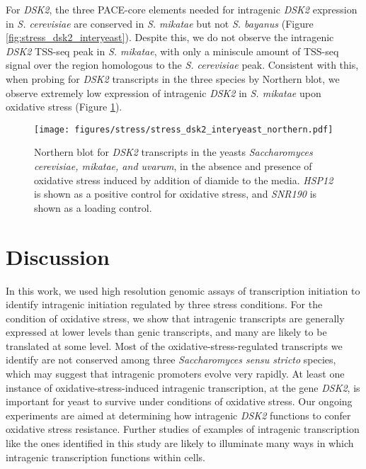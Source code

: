 For \textit{DSK2}, the three PACE-core elements needed for intragenic \textit{DSK2} expression in \textit{S. cerevisiae} are conserved in \textit{S. mikatae} but not \textit{S. bayanus} (Figure \ref{fig:stress_dsk2_interyeast}).
Despite this, we do not observe the intragenic \textit{DSK2} TSS-seq peak in \textit{S. mikatae}, with only a miniscule amount of TSS-seq signal over the region homologous to the \textit{S. cerevisiae} peak.
Consistent with this, when probing for \textit{DSK2} transcripts in the three species by Northern blot, we observe extremely low expression of intragenic \textit{DSK2} in \textit{S. mikatae} upon oxidative stress (Figure \ref{fig:stress_dsk2_interyeast_northern}).

\begin{figure}[h]
    \centering
    \texttt{[image: figures/stress/stress\_dsk2\_interyeast\_northern.pdf]}
    \caption[Northern blot for \textit{DSK2} transcripts in the yeasts \textit{Saccharomyces cerevisiae, mikatae, and uvarum}, in the absence and presence of oxidative stress.]{Northern blot for \textit{DSK2} transcripts in the yeasts \textit{Saccharomyces cerevisiae, mikatae, and uvarum}, in the absence and presence of oxidative stress induced by addition of diamide to the media. \textit{HSP12} is shown as a positive control for oxidative stress, and \textit{SNR190} is shown as a loading control.}
    \label{fig:stress_dsk2_interyeast_northern}
\end{figure}

\section{Discussion}

In this work, we used high resolution genomic assays of transcription initiation to identify intragenic initiation regulated by three stress conditions.
For the condition of oxidative stress, we show that intragenic transcripts are generally expressed at lower levels than genic transcripts, and many are likely to be translated at some level.
Most of the oxidative-stress-regulated transcripts we identify are not conserved among three \textit{Saccharomyces sensu stricto} species, which may suggest that intragenic promoters evolve very rapidly.
At least one instance of oxidative-stress-induced intragenic transcription, at the gene \textit{DSK2}, is important for yeast to survive under conditions of oxidative stress.
Our ongoing experiments are aimed at determining how intragenic \textit{DSK2} functions to confer oxidative stress resistance.
Further studies of examples of intragenic transcription like the ones identified in this study are likely to illuminate many ways in which intragenic transcription functions within cells.

